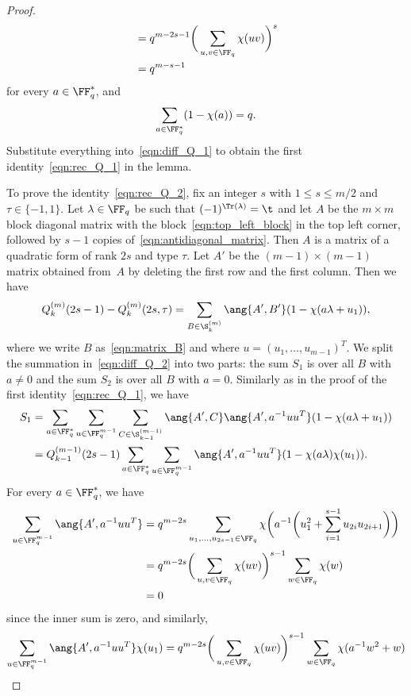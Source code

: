 \begin{proof}
\begin{align*}
&=q^{m-2s-1}\bigg(\sum_{u,v\in\FF_q}\chi(uv)\bigg)^s\\
&=q^{m-s-1}
\end{align*}
for every $a\in\FF_q^*$, and
\[
\sum_{a\in\FF_q^*}(1-\chi(a))=q.
\]
Substitute everything into~\eqref{eqn:diff_Q_1} to obtain the first identity~\eqref{eqn:rec_Q_1} in the lemma.
\par
To prove the identity~\eqref{eqn:rec_Q_2}, fix an integer $s$ with $1\le s\le m/2$ and $\tau\in\{-1,1\}$. Let $\lambda\in\FF_q$ be such that $(-1)^{\Tr(\lambda)}=\t$ and let $A$ be the $m\times m$ block diagonal matrix with the block~\eqref{eqn:top_left_block} in the top left corner, followed by $s-1$ copies of~\eqref{eqn:antidiagonal_matrix}. Then $A$ is a matrix of a quadratic form of rank $2s$ and type $\tau$. Let $A'$ be the $(m-1)\times (m-1)$ matrix obtained from~$A$ by deleting the first row and the first column. Then we have
\begin{equation}
Q^{(m)}_k(2s-1)-Q^{(m)}_k(2s,\tau)=\sum_{B\in\S^{(m)}_k}\ang{A',B'}(1-\chi(a\lambda+u_1)),   \label{eqn:diff_Q_2}
\end{equation}
where we write $B$ as~\eqref{eqn:matrix_B} and where $u=(u_1,\dots,u_{m-1})^T$. We split the summation in~\eqref{eqn:diff_Q_2} into two parts: the sum $S_1$ is over all $B$ with $a\ne 0$ and the sum $S_2$ is over all $B$ with $a=0$. Similarly as in the proof of the first identity~\eqref{eqn:rec_Q_1}, we have
\begin{align}
S_1&=\sum_{a\in\FF_q^*}\sum_{u\in\FF_q^{m-1}}\sum_{C\in\S^{(m-1)}_{k-1}}\ang{A',C}\ang{A',a^{-1}uu^T}(1-\chi(a\lambda+u_1))   \nonumber\\
&=Q^{(m-1)}_{k-1}(2s-1)\sum_{a\in\FF_q^*}\sum_{u\in\FF_q^{m-1}}\ang{A',a^{-1}uu^T}(1-\chi(a\lambda)\chi(u_1)).   \label{eqn:sum_S1}
\end{align}
For every $a\in\FF_q^*$, we have
\begin{align*}
\sum_{u\in\FF_q^{m-1}}\ang{A',a^{-1}uu^T}&=q^{m-2s}\sum_{u_1,\dots,u_{2s-1}\in\FF_q}\chi\bigg(a^{-1}\bigg(u_1^2+\sum_{i=1}^{s-1}u_{2i}u_{2i+1}\bigg)\bigg)\\
&=q^{m-2s}\bigg(\sum_{u,v\in\FF_q}\chi(uv)\bigg)^{s-1}\sum_{w\in\FF_q}\chi(w)\\
&=0
\end{align*}
since the inner sum is zero, and similarly,
\begin{align*}
\sum_{u\in\FF_q^{m-1}}\ang{A',a^{-1}uu^T}\chi(u_1)&=q^{m-2s}\bigg(\sum_{u,v\in\FF_q}\chi(uv)\bigg)^{s-1}\sum_{w\in\FF_q}\chi(a^{-1}w^2+w)\\

\end{align*}
\end{proof}
